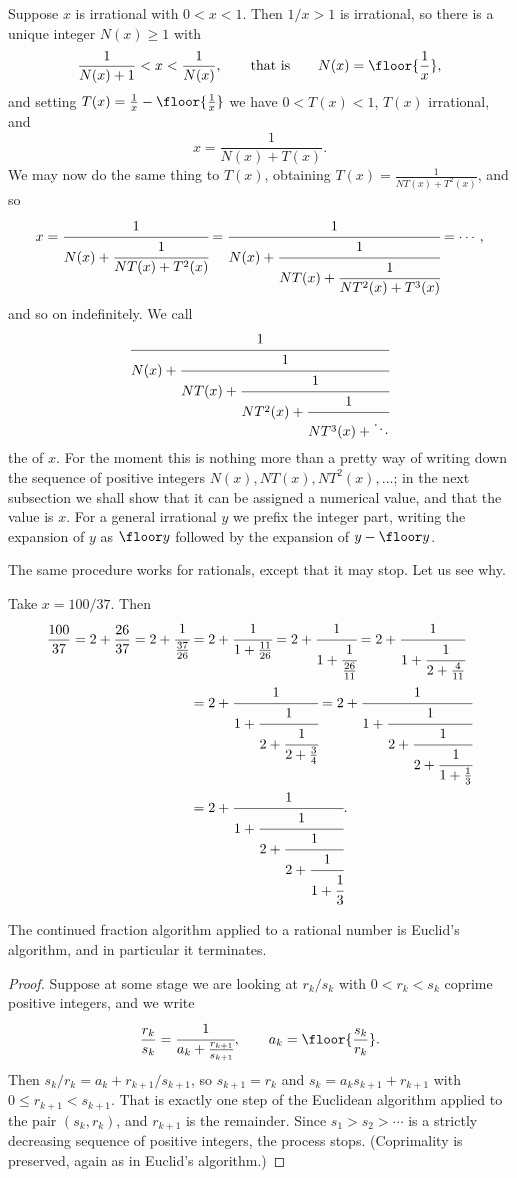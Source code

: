 Suppose $x$ is irrational with $0<x<1$. Then $1/x>1$ is irrational, so there is a unique integer $N(x)\geq1$ with
$$\frac{1}{N(x)+1} < x < \frac{1}{N(x)}, \qquad\text{that is}\qquad N(x) = \floor{\frac1x},$$
and setting $T(x) = \frac1x - \floor{\frac1x}$ we have $0<T(x)<1$, $T(x)$ irrational, and
$$x = \frac{1}{N(x)+T(x)}.$$
We may now do the same thing to $T(x)$, obtaining $T(x) = \frac{1}{NT(x)+T^2(x)}$, and so
$$x = \cfrac{1}{N(x)+\cfrac{1}{NT(x)+T^2(x)}} = \cfrac{1}{N(x)+\cfrac{1}{NT(x)+\cfrac{1}{NT^2(x)+T^3(x)}}} = \cdots,$$
and so on indefinitely. We call
$$\cfrac{1}{N(x)+\cfrac{1}{NT(x)+\cfrac{1}{NT^2(x)+\cfrac{1}{NT^3(x)+\ddots}}}}$$
the  of $x$. For the moment this is nothing more than a pretty way of writing down the sequence of positive integers $N(x), NT(x), NT^2(x),\ldots$; in the next subsection we shall show that it can be assigned a numerical value, and that the value is $x$. For a general irrational $y$ we prefix the integer part, writing the expansion of $y$ as $\floor y$ followed by the expansion of $y - \floor y$.

The same procedure works for rationals, except that it may stop. Let us see why.

\begin{example}\label{ex:100over37}
	Take $x = 100/37$. Then
	\begin{align*}
		\frac{100}{37} = 2 + \frac{26}{37} = 2+\cfrac{1}{\frac{37}{26}} &= 2+\cfrac{1}{1+\frac{11}{26}} = 2+\cfrac1{1+\cfrac1{\frac{26}{11}}} = 2+\cfrac1{1+\cfrac1{2+\frac{4}{11}}} \\
		&= 2+\cfrac1{1+\cfrac1{2+\cfrac1{2+\frac34}}} = 2+\cfrac1{1+\cfrac1{2+\cfrac1{2+\cfrac1{1+\frac13}}}} \\
			&= 2+\cfrac1{1+\cfrac1{2+\cfrac1{2+\cfrac1{1+\cfrac13}}}}.
	\end{align*}
\end{example}

\begin{lemma}\label{lem:cf-euclid}
	The continued fraction algorithm applied to a rational number is Euclid's algorithm, and in particular it terminates.
\end{lemma}

\begin{proof}
	Suppose at some stage we are looking at $r_k/s_k$ with $0<r_k<s_k$ coprime positive integers, and we write
	$$\frac{r_k}{s_k} = \cfrac{1}{a_k + \frac{r_{k+1}}{s_{k+1}}}, \qquad a_k = \floor{\frac{s_k}{r_k}}.$$
	Then $s_k/r_k = a_k + r_{k+1}/s_{k+1}$, so $s_{k+1} = r_k$ and $s_k = a_ks_{k+1}+r_{k+1}$ with $0\leq r_{k+1}<s_{k+1}$. That is exactly one step of the Euclidean algorithm applied to the pair $(s_k,r_k)$, and $r_{k+1}$ is the remainder. Since $s_1>s_2>\cdots$ is a strictly decreasing sequence of positive integers, the process stops. (Coprimality is preserved, again as in Euclid's algorithm.)
\end{proof}

